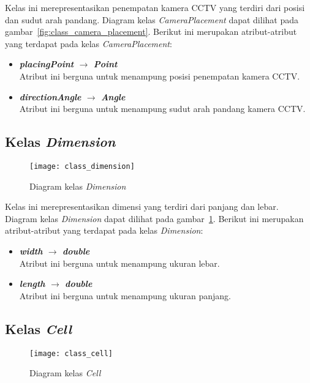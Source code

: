 Kelas ini merepresentasikan penempatan kamera CCTV yang terdiri dari posisi dan sudut arah pandang. Diagram kelas \textit{CameraPlacement} dapat dilihat pada gambar~\ref{fig:class_camera_placement}. Berikut ini merupakan atribut-atribut yang terdapat pada kelas \textit{CameraPlacement}:
\begin{itemize}
	\item \textbf{\textit{placingPoint} \(\rightarrow\) \textit{Point}}\\
	Atribut ini berguna untuk menampung posisi penempatan kamera CCTV.
	\item \textbf{\textit{directionAngle} \(\rightarrow\) \textit{Angle}}\\
	Atribut ini berguna untuk menampung sudut arah pandang kamera CCTV.
\end{itemize}

\subsection{Kelas \textit{Dimension}}
\begin{figure}[H]
	\centering  
	\texttt{[image: class\_dimension]}
	\caption[Diagram kelas \textit{Dimension}]{Diagram kelas \textit{Dimension}}
	\label{fig:class_dimension}
\end{figure}

Kelas ini merepresentasikan dimensi yang terdiri dari panjang dan lebar. Diagram kelas \textit{Dimension} dapat dilihat pada gambar~\ref{fig:class_dimension}. Berikut ini merupakan atribut-atribut yang terdapat pada kelas \textit{Dimension}:
\begin{itemize}
	\item \textbf{\textit{width} \(\rightarrow\) \textit{double}}\\
	Atribut ini berguna untuk menampung ukuran lebar.
	\item \textbf{\textit{length} \(\rightarrow\) \textit{double}}\\
	Atribut ini berguna untuk menampung ukuran panjang.
\end{itemize}

\subsection{Kelas \textit{Cell}}
\begin{figure}[H]
	\centering  
	\texttt{[image: class\_cell]}
	\caption[Diagram kelas \textit{Cell}]{Diagram kelas \textit{Cell}}
	\label{fig:class_cell}
\end{figure}

